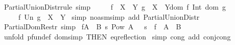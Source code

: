 \begin{isabellebody}
%
\isadelimproof
\isanewline
%
\endisadelimproof
\isanewline
{}\isamarkupfalse%
\ Partial{\isacharunderscore}Union{\isacharunderscore}Distr{\isacharunderscore}rule\ {\isacharbrackleft}simp{\isacharbrackright}{\isacharcolon}\isanewline
\ \ \ \ {\isachardoublequoteopen}{\isacharbrackleft}{\isacharbar}\ f\ {\isacharcolon}\ {\isacharparenleft}X\ {\isacharminus}{\isacharbar}{\isacharminus}{\isachargreater}\ Y{\isacharparenright}{\isacharsemicolon}\ g\ {\isacharcolon}\ {\isacharparenleft}X\ {\isacharminus}{\isacharbar}{\isacharminus}{\isachargreater}\ Y{\isacharparenright}{\isacharsemicolon}{\isacharparenleft}dom\ f\ Int\ dom\ g{\isacharparenright}\ {\isacharequal}\ {\isacharbraceleft}{\isacharbraceright}{\isacharbar}{\isacharbrackright}\ \isanewline
\ \ \ \ {\isacharequal}{\isacharequal}{\isachargreater}\ {\isacharparenleft}f\ Un\ g\ {\isacharcolon}\ {\isacharparenleft}X\ {\isacharminus}{\isacharbar}{\isacharminus}{\isachargreater}\ Y{\isacharparenright}{\isacharparenright}{\isachardoublequoteclose}\isanewline
%
\isadelimproof
%
\endisadelimproof
%
\isatagproof
{}\isamarkupfalse%
\ {\isacharparenleft}simp\ {\isacharparenleft}no{\isacharunderscore}asm{\isacharunderscore}simp{\isacharparenright}\ add{\isacharcolon}\ Partial{\isacharunderscore}Union{\isacharunderscore}Distr{\isacharparenright}\isanewline
{}\isamarkupfalse%
%
\endisatagproof
{\isafoldproof}%
%
\isadelimproof
\isanewline
%
\endisadelimproof
\isanewline
{}\isamarkupfalse%
\ Partial{\isacharunderscore}Dom{\isacharunderscore}Restr\ {\isacharbrackleft}simp{\isacharbrackright}{\isacharcolon}\ \isanewline
{\isachardoublequoteopen}{\isacharbrackleft}{\isacharbar}f{\isacharcolon}{\isacharparenleft}A\ {\isacharminus}{\isacharbar}{\isacharminus}{\isachargreater}\ B{\isacharparenright}{\isacharsemicolon}\ s{\isacharcolon}\ {\isacharparenleft}Pow\ A{\isacharparenright}\ {\isacharbar}{\isacharbrackright}\ {\isacharequal}{\isacharequal}{\isachargreater}\ {\isacharparenleft}{\isacharparenleft}s\ {\isacharless}{\isacharcolon}\ f{\isacharparenright}\ {\isacharcolon}\ {\isacharparenleft}A\ {\isacharminus}{\isacharbar}{\isacharminus}{\isachargreater}\ B{\isacharparenright}{\isacharparenright}{\isachardoublequoteclose}\isanewline
%
\isadelimproof
%
\endisadelimproof
%
\isatagproof
{}\isamarkupfalse%
\ {\isacharparenleft}unfold\ pfun{\isacharunderscore}def\ dom{\isacharunderscore}simp\ {\isacharbrackleft}THEN\ eq{\isacharunderscore}reflection{\isacharbrackright}{\isacharparenright}\isanewline
{}\isamarkupfalse%
\ {\isacharparenleft}simp\ cong\ add{\isacharcolon}\ conj{\isacharunderscore}cong{\isacharparenright}\isanewline

\end{isabellebody}
